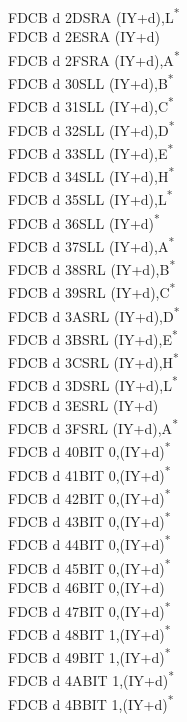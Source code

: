 \documentclass[twoside,openright,a4paper]{book}
\begin{document}
\begin{multicols}{3}
{\begin{tabbing}
	FDCB d 2D\>SRA (IY+d),L\textsuperscript{*}\\
	FDCB d 2E\>SRA (IY+d)\\
	FDCB d 2F\>SRA (IY+d),A\textsuperscript{*}\\
	FDCB d 30\>SLL (IY+d),B\textsuperscript{*}\\
	FDCB d 31\>SLL (IY+d),C\textsuperscript{*}\\
	FDCB d 32\>SLL (IY+d),D\textsuperscript{*}\\
	FDCB d 33\>SLL (IY+d),E\textsuperscript{*}\\
	FDCB d 34\>SLL (IY+d),H\textsuperscript{*}\\
	FDCB d 35\>SLL (IY+d),L\textsuperscript{*}\\
	FDCB d 36\>SLL (IY+d)\textsuperscript{*}\\
	FDCB d 37\>SLL (IY+d),A\textsuperscript{*}\\
	FDCB d 38\>SRL (IY+d),B\textsuperscript{*}\\
	FDCB d 39\>SRL (IY+d),C\textsuperscript{*}\\
	FDCB d 3A\>SRL (IY+d),D\textsuperscript{*}\\
	FDCB d 3B\>SRL (IY+d),E\textsuperscript{*}\\
	FDCB d 3C\>SRL (IY+d),H\textsuperscript{*}\\
	FDCB d 3D\>SRL (IY+d),L\textsuperscript{*}\\
	FDCB d 3E\>SRL (IY+d)\\
	FDCB d 3F\>SRL (IY+d),A\textsuperscript{*}\\
	FDCB d 40\>BIT 0,(IY+d)\textsuperscript{*}\\
	FDCB d 41\>BIT 0,(IY+d)\textsuperscript{*}\\
	FDCB d 42\>BIT 0,(IY+d)\textsuperscript{*}\\
	FDCB d 43\>BIT 0,(IY+d)\textsuperscript{*}\\
	FDCB d 44\>BIT 0,(IY+d)\textsuperscript{*}\\
	FDCB d 45\>BIT 0,(IY+d)\textsuperscript{*}\\
	FDCB d 46\>BIT 0,(IY+d)\\
	FDCB d 47\>BIT 0,(IY+d)\textsuperscript{*}\\
	FDCB d 48\>BIT 1,(IY+d)\textsuperscript{*}\\
	FDCB d 49\>BIT 1,(IY+d)\textsuperscript{*}\\
	FDCB d 4A\>BIT 1,(IY+d)\textsuperscript{*}\\
	FDCB d 4B\>BIT 1,(IY+d)\textsuperscript{*}\\

\end{tabbing}}
\end{multicols}
\end{document}
